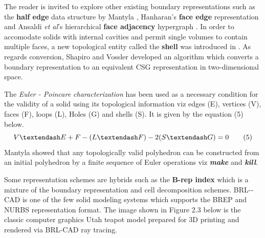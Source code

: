 \hspace{30} The  reader   is   invited   to   explore   other   existing   boundary   representations  
such   as   the  \textbf{half ­edge}   data   structure   by   Mantyla   \cite{19},   Hanharan's   \textbf{face ­edge}  
representation   \cite{20}   and   Ansaldi   \textit {et al}'s   hierarchical   \textbf{face   adjacency}   hypergraph  
\cite{21}.   In  order   to   accomodate   solids   with   internal   cavities   and   permit   single  
volumes   to   contain   multiple   faces,   a   new   topological   entity   called   the   \textbf{shell}   was  
introduced   in   \cite{21}.   As   regards   conversion,   Shapiro   and   Vossler   \cite{22}   developed  
an   algorithm   which   converts   a   boundary   representation   to   an   equivalent   CSG  
representation in two-­dimensional space.

\hspace{30} The   \textit{Euler - ­Poincare   characterization}   has   been   used   as   a   necessary  
condition   for   the   validity   of   a   solid   using   its   topological   information   viz   edges  
(E),   vertices   (V),   faces   (F),   loops   (L),   Holes   (G)   and   shells   (S).   It   is   given   by   the  
equation (5) below.
\begin{equation*}
\centering
 V – E + F -­ ( L – F ) - 2(S – G ) = 0 ­­­­­­­­­­­­­­ \tag{5}
\end{equation*}
Mantyla   showed   that   any   topologically   valid   polyhedron   can   be   constructed  
from   an   initial   polyhedron   by   a   finite   sequence   of   Euler   operations   viz   \textit{\textbf{make}}  
and \textit{\textbf{kill}}.

\hspace{30} Some   representation   schemes   are   hybrids   such   as   the   \textbf{B-­rep index}   which  
is   a   mixture   of   the   boundary   representation   and   cell   decomposition   schemes.  
BRL-­CAD   is   one   of   the   few   solid   modeling   systems   which   supports   the  
BREP and NURBS   representation   format.  The   image   shown   in   Figure   2.3   below   is   the   classic   computer   graphics   Utah  teapot model prepared for 3D printing and rendered via BRL-­CAD ray tracing.\\

